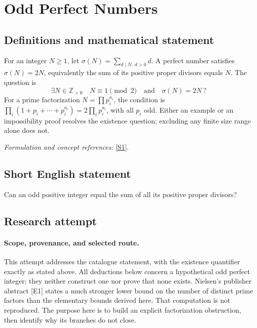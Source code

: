 \documentclass[11pt]{article}
\begin{document}
\section*{\texorpdfstring{Odd Perfect Numbers}{Odd Perfect Numbers}}\label{statement}
\subsection{Definitions and mathematical statement}
For an integer $N\ge1$, let $\sigma(N)=\sum_{d\mid N,\ d>0}d$. A perfect number satisfies $\sigma(N)=2N$, equivalently the sum of its positive proper divisors equals $N$. The question is
\[
 \exists N\in{\mathbb{Z}}_{>0}\quad N\equiv1\pmod2\quad\text{and}\quad\sigma(N)=2N\ ?
\]
For a prime factorization $N=\prod p_i^{a_i}$, the condition is
$\prod_i(1+p_i+\cdots+p_i^{a_i})=2\prod_i p_i^{a_i}$, with all $p_i$ odd. Either an example or an impossibility proof resolves the existence question; excluding any finite size range alone does not.
\par\smallskip\textit{Formulation and concept references:} \href{https://www.ams.org/mcom/2015-84-295/S0025-5718-2015-02941-X/S0025-5718-2015-02941-X.pdf}{[S1]}.

\subsection{Short English statement}
Can an odd positive integer equal the sum of all its positive proper divisors?
\subsection{Research attempt}

\paragraph{Scope, provenance, and selected route.}
This attempt addresses the catalogue statement, with the existence quantifier exactly
as stated above. All deductions below concern a hypothetical odd perfect
integer; they neither construct one nor prove that none exists. Nielsen's
publisher abstract [E1] states a much stronger lower bound on the number
of distinct prime factors than the elementary bounds derived here. That
computation is not reproduced. The purpose here is to build an explicit
factorization obstruction, then identify why its branches do not close.
\end{document}
